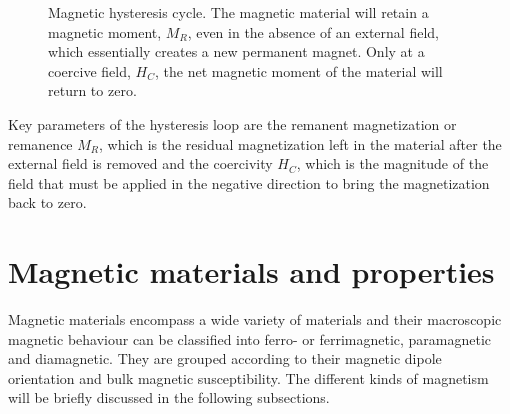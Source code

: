\begin{figure}[htb]
\centering
\caption[Magnetic hysteresis cycle]{Magnetic hysteresis cycle. The magnetic material will retain a magnetic moment, $M_{R}$, even in the absence of an external field, which essentially creates a new permanent magnet. Only at a coercive field, $H_{C}$, the net magnetic moment of the material will return to zero.}%
\label{fig:magneticHysteresis}%
\end{figure}

Key parameters of the hysteresis loop are the remanent magnetization or remanence $M_{R}$, which is the residual magnetization left in the material after the external field is removed and the coercivity $H_{C}$, which is the magnitude of the field that must be applied in the negative direction to bring the magnetization back to zero. 


\section{Magnetic materials and properties}
Magnetic materials encompass a wide variety of materials and their macroscopic magnetic behaviour can be classified into ferro- or ferrimagnetic, paramagnetic and diamagnetic. They are grouped according to their magnetic dipole orientation and bulk magnetic susceptibility. The different kinds of magnetism will be briefly discussed in the following subsections.

